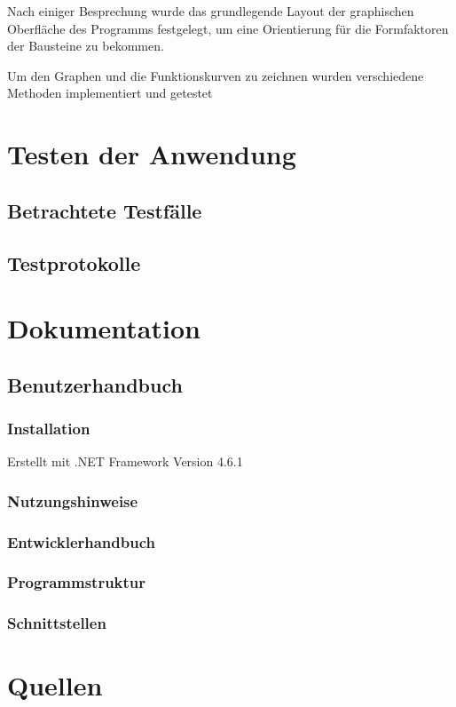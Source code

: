 \documentclass{article}
\begin{document}
    Nach einiger Besprechung wurde das grundlegende Layout der graphischen Oberfläche des Programms festgelegt, um eine Orientierung für die Formfaktoren der Bausteine zu bekommen.

    Um den Graphen und die Funktionskurven zu zeichnen wurden verschiedene Methoden implementiert und getestet

\newpage
\section{Testen der Anwendung}

\subsection{Betrachtete Testfälle}


\subsection{Testprotokolle}


\newpage
\section{Dokumentation}

\subsection{Benutzerhandbuch}
    \subsubsection{Installation}

    Erstellt mit .NET Framework Version 4.6.1

    \subsubsection{Nutzungshinweise}

\subsubsection{Entwicklerhandbuch}
    \subsubsection{Programmstruktur}

    \subsubsection{Schnittstellen}

\newpage
\section{Quellen}


\end{document}
